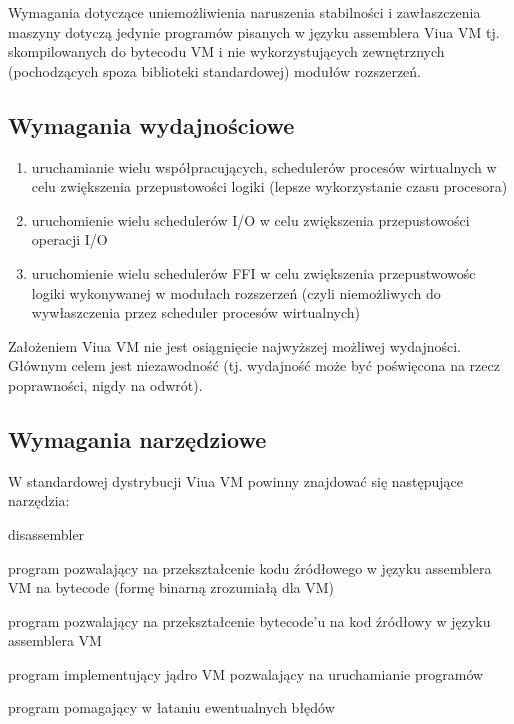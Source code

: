 \documentclass[11pt,oneside,a4paper,titlepage,onecolumn]{article}
\begin{document}
Wymagania dotyczące uniemożliwienia naruszenia stabilności i zawłaszczenia maszyny dotyczą jedynie programów
pisanych w języku assemblera Viua VM tj. skompilowanych do bytecodu VM i nie wykorzystujących zewnętrznych
(pochodzących spoza biblioteki standardowej) modułów rozszerzeń.

\subsection{Wymagania wydajnościowe}

\begin{enumerate}
    \item uruchamianie wielu współpracujących, schedulerów procesów wirtualnych w celu zwiększenia
        przepustowości logiki (lepsze wykorzystanie czasu procesora)
    \item uruchomienie wielu schedulerów I/O w celu zwiększenia przepustowości operacji I/O
    \item uruchomienie wielu schedulerów FFI w celu zwiększenia przepustwowośc logiki wykonywanej w modułach
        rozszerzeń (czyli niemożliwych do wywłaszczenia przez scheduler procesów wirtualnych)
\end{enumerate}

Założeniem Viua VM nie jest osiągnięcie najwyższej możliwej wydajności. Głównym celem jest niezawodność (tj.
wydajność może być poświęcona na rzecz poprawności, nigdy na odwrót).

\subsection{Wymagania narzędziowe}

W standardowej dystrybucji Viua VM powinny znajdować się następujące narzędzia:

\begin{labeling}{disassembler}
\item [\texttt{assembler}] program pozwalający na przekształcenie kodu źródłowego w języku assemblera VM
    na bytecode (formę binarną zrozumiałą dla VM)
\item [\texttt{disassembler}] program pozwalający na przekształcenie bytecode'u na kod źródłowy w języku assemblera VM
\item [\texttt{kernel}] program implementujący jądro VM pozwalający na uruchamianie programów
\item [\texttt{debugger}] program pomagający w łataniu ewentualnych błędów
\end{labeling}
\end{document}
